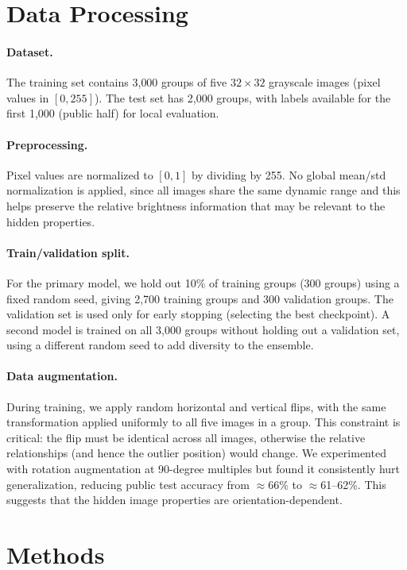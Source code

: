 \documentclass[11pt]{article}
\begin{document}
\section{Data Processing}

\paragraph{Dataset.}
The training set contains 3{,}000 groups of five $32\times32$ grayscale images (pixel values in $[0, 255]$).
The test set has 2{,}000 groups, with labels available for the first 1{,}000 (public half) for local
evaluation.

\paragraph{Preprocessing.}
Pixel values are normalized to $[0, 1]$ by dividing by 255. No global mean/std normalization is
applied, since all images share the same dynamic range and this helps preserve the relative brightness
information that may be relevant to the hidden properties.

\paragraph{Train/validation split.}
For the primary model, we hold out 10\% of training groups (300 groups) using a fixed random seed,
giving 2{,}700 training groups and 300 validation groups. The validation set is used only for early
stopping (selecting the best checkpoint). A second model is trained on all 3{,}000 groups without
holding out a validation set, using a different random seed to add diversity to the ensemble.

\paragraph{Data augmentation.}
During training, we apply random horizontal and vertical flips, with the same transformation applied
uniformly to all five images in a group. This constraint is critical: the flip must be identical across all
images, otherwise the relative relationships (and hence the outlier position) would change.
We experimented with rotation augmentation at 90-degree multiples but found it consistently hurt
generalization, reducing public test accuracy from $\approx$66\% to $\approx$61--62\%. This suggests that the
hidden image properties are orientation-dependent.

\section{Methods}
\end{document}
